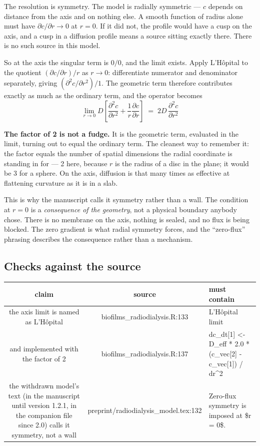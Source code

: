 \documentclass[11pt]{article}
\newcommand{\us}{\_\allowbreak}
\newcommand{\checkhead}{%
  \toprule
  \textbf{\normalsize claim} & \textbf{\normalsize source} & \textbf{\normalsize must contain} \\
  \midrule
}
\begin{document}
The resolution is symmetry. The model is radially symmetric — $c$ depends on
distance from the axis and on nothing else. A smooth function of radius alone must have
$\partial c/\partial r \to 0$ at $r = 0$. If it did not, the profile would have a cusp on the
axis, and a cusp in a diffusion profile means a source sitting exactly there. There is no
such source in this model.

So at the axis the singular term is $0/0$, and the limit exists. Apply L'Hôpital to the
quotient $(\partial c/\partial r)/r$ as $r \to 0$: differentiate numerator and denominator
separately, giving $(\partial^2 c/\partial r^2)/1$. The geometric term therefore contributes
exactly as much as the ordinary term, and the operator becomes
\[
\lim_{r\to 0} D\left[\frac{\partial^2 c}{\partial r^2}
 + \frac{1}{r}\frac{\partial c}{\partial r}\right]
 \;=\; 2D\,\frac{\partial^2 c}{\partial r^2}
\]

\textbf{The factor of 2 is not a fudge.} It is the geometric term, evaluated in the limit,
turning out to equal the ordinary term. The cleanest way to remember it: the factor equals
the number of spatial dimensions the radial coordinate is standing in for — 2 here, because
$r$ is the radius of a disc in the plane; it would be 3 for a sphere. On the axis, diffusion
is that many times as effective at flattening curvature as it is in a slab.

This is why the manuscript calls it symmetry rather than a wall. The condition at
$r = 0$ is a \emph{consequence of the geometry}, not a physical boundary anybody chose. There
is no membrane on the axis, nothing is sealed, and no flux is being blocked. The zero
gradient is what radial symmetry forces, and the ``zero-flux'' phrasing describes the
consequence rather than a mechanism.

\subsection*{Checks against the source}

\begin{longtable}{CSF}
\checkhead
\endhead
the axis limit is named as L'Hôpital
  & biofilms\us radiodialysis.R:133
  & L'Hôpital limit \\[0.35em]
and implemented with the factor of 2
  & biofilms\us radiodialysis.R:137
  & dc\_dt[1] <- D\_eff * 2.0 * (c\_vec[2] - c\_vec[1]) / dr\^{}2 \\[0.35em]
the withdrawn model's text (in the manuscript until version 1.2.1, in the companion file since 2.0) calls it symmetry, not a wall
  & preprint/radiodialysis\us model.tex:132
  & Zero-flux symmetry is imposed at \$r = 0\$. \\
\bottomrule
\end{longtable}
\end{document}

